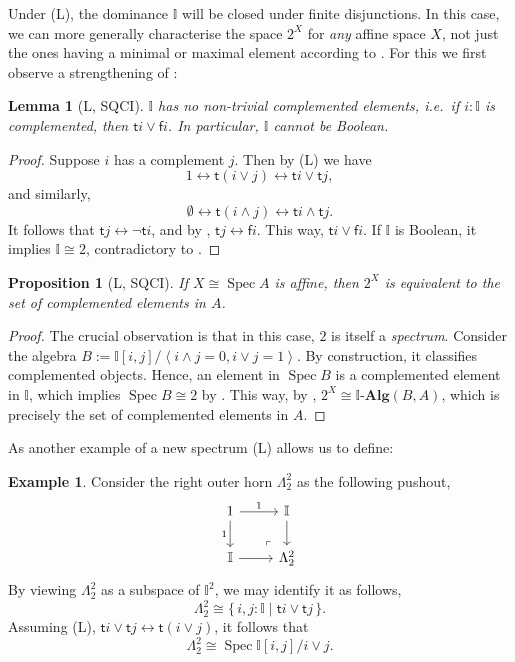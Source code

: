 \documentclass[12pt]{amsart}
\newtheorem{lemma}[theorem]{Lemma}
\newtheorem{proposition}[theorem]{Proposition}
\theoremstyle{definition}
\newtheorem{example}[theorem]{Example}
\newcommand{\mb}[1]{\mathbf{#1}}
\newcommand{\mbb}[1]{\mathbb{#1}}
\newcommand{\I}{\mbb I}
\newcommand{\ms}[1]{\mathsf{#1}}
\newcommand{\alg}{\text{-}\mb{Alg}}
\newcommand{\pair}[1]{\left\langle#1\right\rangle}
\newcommand{\scomp}[2]{\{\,#1\mid#2\,\}}
\newcommand{\emp}{\emptyset}
\newcommand{\eq}{\leftrightarrow}
\newcommand{\spec}{\operatorname{Spec}}
\begin{document}
Under (L), the dominance $\I$ will be closed under finite disjunctions. In this case, we can more generally characterise the space $2^X$ for \emph{any} affine space $X$, not just the ones having a minimal or maximal element according to . For this we first observe a strengthening of :

\begin{lemma}[L, SQCI]\label{lem:intisnotBoolean}
  $\I$ has no non-trivial complemented elements, i.e.\ if $i : \I$ is complemented, then $\ms ti \vee \ms fi$. In particular, $\I$ cannot be Boolean.
\end{lemma}
\begin{proof}
  Suppose $i$ has a complement $j$. Then by (L) we have
  \[ 1 \eq \ms t(i \vee j) \eq \ms ti \vee \ms tj, \]
  and similarly,
  \[ \emp \eq \ms t(i \wedge j) \eq \ms ti \wedge \ms tj. \]
  It follows that $\ms tj \eq \neg \ms ti$, and by , $\ms tj \eq \ms fi$. This way, $\ms ti \vee \ms fi$. If $\I$ is Boolean, it implies $\I \cong 2$, contradictory to .
\end{proof}

\begin{proposition}[L, SQCI]\label{prop:complementinalgebra}
  If $X \cong \spec A$ is affine, then $2^X$ is equivalent to the set of complemented elements in $A$.
\end{proposition}
\begin{proof}
  The crucial observation is that in this case, $2$ is itself a \emph{spectrum}. Consider the algebra $B := \I[i,j]/\pair{i\wedge j =0,i\vee j = 1}$. By construction, it classifies complemented objects. Hence, an element in $\spec B$ is a complemented element in $\I$, which implies $\spec B \cong 2$ by . This way, by , $2^X \cong \I\alg(B,A)$, which is precisely the set of complemented elements in $A$.
\end{proof}

As another example of a new spectrum (L) allows us to define:

\begin{example}\label{exm:hornaffine}
  Consider the right outer horn $\Lambda^2_2$ as the following pushout,
  \[
    \begin{tikzcd}
      1 \ar[d, "1"'] \ar[r, "1"] & \I \ar[d] \\
      \I \ar[r] & \Lambda^2_2
      \arrow["\lrcorner"{anchor=center, pos=0.125, rotate=180}, draw=none, from=2-2, to=1-1]
    \end{tikzcd}
  \]
  By viewing $\Lambda^2_2$ as a subspace of $\I^2$, we may identify it as follows,
  \[ \Lambda^2_2 \cong \scomp{i,j : \I}{\ms ti \vee \ms tj}. \]
  Assuming (L), $\ms ti \vee \ms tj \eq \ms t(i\vee j)$, it follows that 
  \[ \Lambda^2_2 \cong \spec \I[i,j]/i \vee j. \]
\end{example}
\end{document}
